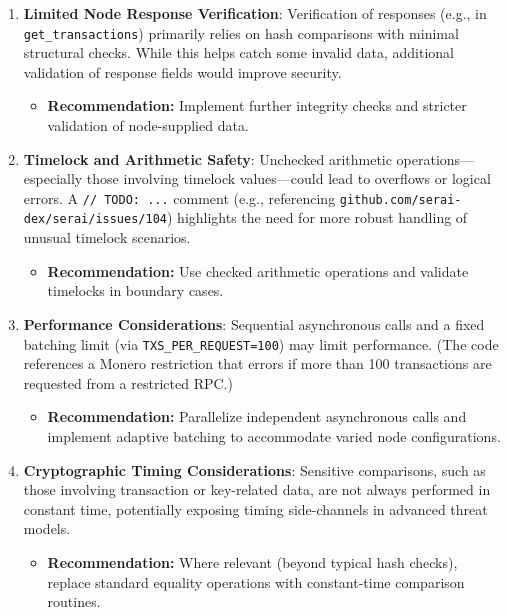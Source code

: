 \documentclass[12pt,a4paper]{article}
\begin{document}
\begin{enumerate}
    \item \textbf{Limited Node Response Verification}:  
    Verification of responses (e.g., in \texttt{get\_transactions}) primarily relies on hash
    comparisons with minimal structural checks. While this helps catch some invalid data, additional
    validation of response fields would improve security.
    \begin{itemize}
        \item \textbf{Recommendation:} Implement further integrity checks and stricter validation of
        node-supplied data.
    \end{itemize}

    \item \textbf{Timelock and Arithmetic Safety}:  
    Unchecked arithmetic operations—especially those involving timelock values—could lead to
    overflows or logical errors. A \texttt{// TODO: ...} comment (e.g., referencing
    \texttt{github.com/serai-dex/serai/issues/104}) highlights the need for more robust handling of
    unusual timelock scenarios.
    \begin{itemize}
        \item \textbf{Recommendation:} Use checked arithmetic operations and validate timelocks in
        boundary cases.
    \end{itemize}

    \item \textbf{Performance Considerations}:  
    Sequential asynchronous calls and a fixed batching limit (via \texttt{TXS\_PER\_REQUEST=100})
    may limit performance. (The code references a Monero restriction that errors if more than 100
    transactions are requested from a restricted RPC.)
    \begin{itemize}
        \item \textbf{Recommendation:} Parallelize independent asynchronous calls and implement
        adaptive batching to accommodate varied node configurations.
    \end{itemize}

    \item \textbf{Cryptographic Timing Considerations}:  
    Sensitive comparisons, such as those involving transaction or key-related data, are not always
    performed in constant time, potentially exposing timing side-channels in advanced threat models.
    \begin{itemize}
        \item \textbf{Recommendation:} Where relevant (beyond typical hash checks), replace standard
        equality operations with constant-time comparison routines.
    \end{itemize}
\end{enumerate}
\end{document}
